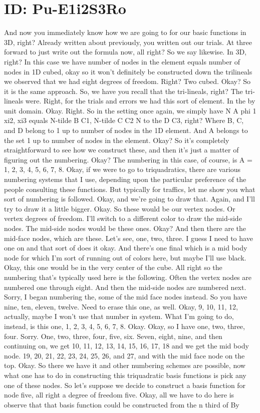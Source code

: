 \documentclass[10pt]{article}
\begin{document}
\section*{ID: Pu-E1i2S3Ro}
And now you immediately know how we are going to for our basic functions in 3D, right? Already written about previously, you written out our trials. At three forward to just write out the formula now, all right? So we say likewise. In 3D, right? In this case we have number of nodes in the element equals number of nodes in 1D cubed, okay so it won't definitely be constructed down the trilineals we observed that we had eight degrees of freedom. Right? Two cubed. Okay? So it is the same approach. So, we have you recall that the tri-lineals, right? The tri-lineals were. Right, for the trials and errors we had this sort of element. In the by unit domain. Okay. Right. So in the setting once again, we simply have N A phi 1 xi2, xi3 equals N-tilde B C1, N-tilde C C2 N to the D C3, right? Where B, C, and D belong to 1 up to number of nodes in the 1D element. And A belongs to the set 1 up to number of nodes in the element. Okay? So it's completely straightforward to see how we construct these, and then it's just a matter of figuring out the numbering. Okay? The numbering in this case, of course, is A = 1, 2, 3, 4, 5, 6, 7, 8. Okay, if we were to go to triquadratics, there are various numbering systems that I use, depending upon the particular preference of the people consulting these functions. But typically for traffics, let me show you what sort of numbering is followed. Okay, and we're going to draw that. Again, and I'll try to draw it a little bigger. Okay. So these would be our vertex nodes. Or vertex degrees of freedom. I'll switch to a different color to draw the mid-side nodes. The mid-side nodes would be these ones. Okay? And then there are the mid-face nodes, which are these. Let's see, one, two, three. I guess I need to have one on and that sort of does it okay. And there's one final which is a mid body node for which I'm sort of running out of colors here, but maybe I'll use black. Okay, this one would be in the very center of the cube. All right so the numbering that's typically used here is the following. Often the vertex nodes are numbered one through eight. And then the mid-side nodes are numbered next. Sorry, I began numbering the, some of the mid face nodes instead. So you have nine, ten, eleven, twelve. Need to erase this one, as well. Okay, 9, 10, 11, 12, actually, maybe I won't use that number in system. What I'm going to do, instead, is this one, 1, 2, 3, 4, 5, 6, 7, 8. Okay. Okay, so I have one, two, three, four. Sorry. One, two, three, four, five, six. Seven, eight, nine, and then continuing on, we get 10, 11, 12, 13, 14, 15, 16, 17, 18 and we get the mid body node. 19, 20, 21, 22, 23, 24, 25, 26, and 27, and with the mid face node on the top. Okay. So there we have it and other numbering schemes are possible, now what one has to do in constructing this triquadratic basis functions is pick any one of these nodes. So let's suppose we decide to construct a basis function for node five, all right a degree of freedom five. Okay, all we have to do here is observe that that basis function could be constructed from the n third of By 
\end{document}
